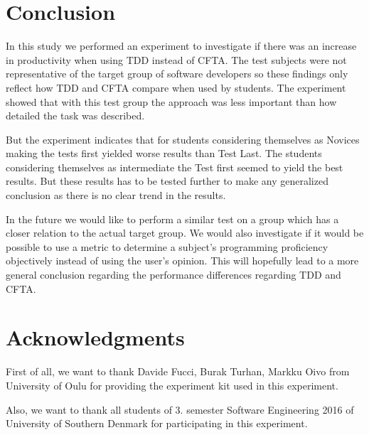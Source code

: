 \documentclass{sig-alternate-05-2015}
\begin{document}
\section{Conclusion}
\label{sec:Conclusion}
In this study we performed an experiment to investigate if there was an increase in productivity when using TDD instead of CFTA. The test subjects were not representative of the target group of software developers so these findings only reflect how TDD and CFTA compare when used by students. The experiment showed that with this test group the approach was less important than how detailed the task was described.

But the experiment indicates that for students considering themselves as Novices making the tests first yielded worse results than Test Last. The students considering themselves as intermediate the Test first seemed to yield the best results. But these results has to be tested further to make any generalized conclusion as there is no clear trend in the results.

In the future we would like to perform a similar test on a group which has a closer relation to the actual target group. We would also investigate if it would be possible to use a metric to determine a subject's programming proficiency objectively instead of using the user's opinion. This will hopefully lead to a more general conclusion regarding the performance differences regarding TDD and CFTA.




\section{Acknowledgments}

First of all, we want to thank Davide Fucci, Burak Turhan, Markku Oivo from University of Oulu for providing the experiment kit used in this experiment.

Also, we want to thank all students of 3. semester Software Engineering 2016 of University of Southern Denmark for participating in this experiment.
\end{document}
